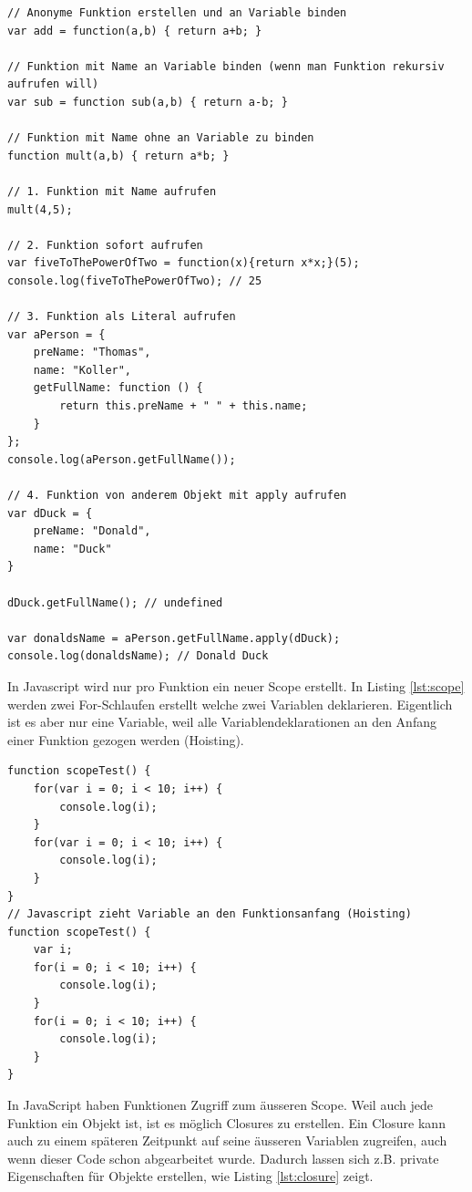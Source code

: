 \begin{lstlisting}[label=lst:methoden-aufruf,caption=Methoden aufrufen]
// Anonyme Funktion erstellen und an Variable binden
var add = function(a,b) { return a+b; }

// Funktion mit Name an Variable binden (wenn man Funktion rekursiv aufrufen will)
var sub = function sub(a,b) { return a-b; }

// Funktion mit Name ohne an Variable zu binden
function mult(a,b) { return a*b; }

// 1. Funktion mit Name aufrufen
mult(4,5);

// 2. Funktion sofort aufrufen
var fiveToThePowerOfTwo = function(x){return x*x;}(5);
console.log(fiveToThePowerOfTwo); // 25

// 3. Funktion als Literal aufrufen
var aPerson = {
	preName: "Thomas",
	name: "Koller",
	getFullName: function () {
		return this.preName + " " + this.name;
	}
};
console.log(aPerson.getFullName());

// 4. Funktion von anderem Objekt mit apply aufrufen
var dDuck = {
	preName: "Donald",
	name: "Duck"
}

dDuck.getFullName(); // undefined

var donaldsName = aPerson.getFullName.apply(dDuck);
console.log(donaldsName); // Donald Duck
\end{lstlisting}

In Javascript wird nur pro Funktion ein neuer Scope erstellt. In Listing \ref{lst:scope} werden zwei For-Schlaufen erstellt welche zwei Variablen deklarieren. Eigentlich ist es aber nur eine Variable, weil alle Variablendeklarationen an den Anfang einer Funktion gezogen werden (Hoisting).

\newpage

\begin{lstlisting}[label=lst:scope,caption=Scope]
function scopeTest() {
	for(var i = 0; i < 10; i++) {
		console.log(i);
	}
	for(var i = 0; i < 10; i++) {
		console.log(i);
	}
}
// Javascript zieht Variable an den Funktionsanfang (Hoisting)
function scopeTest() {
	var i;
	for(i = 0; i < 10; i++) {
		console.log(i);
	}
	for(i = 0; i < 10; i++) {
		console.log(i);
	}
}
\end{lstlisting}

In JavaScript haben Funktionen Zugriff zum äusseren Scope. Weil auch jede Funktion ein Objekt ist, ist es möglich Closures zu erstellen. Ein Closure kann auch zu einem späteren Zeitpunkt auf seine äusseren Variablen zugreifen, auch wenn dieser Code schon abgearbeitet wurde. Dadurch lassen sich z.B. private Eigenschaften für Objekte erstellen, wie Listing \ref{lst:closure} zeigt.

